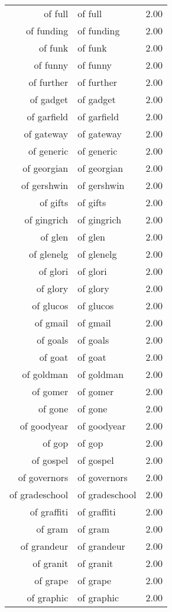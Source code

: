 \begin{table}[ht]
\begin{tabular}{rlr}
  of full & of full & 2.00 \\ 
  of funding & of funding & 2.00 \\ 
  of funk & of funk & 2.00 \\ 
  of funny & of funny & 2.00 \\ 
  of further & of further & 2.00 \\ 
  of gadget & of gadget & 2.00 \\ 
  of garfield & of garfield & 2.00 \\ 
  of gateway & of gateway & 2.00 \\ 
  of generic & of generic & 2.00 \\ 
  of georgian & of georgian & 2.00 \\ 
  of gershwin & of gershwin & 2.00 \\ 
  of gifts & of gifts & 2.00 \\ 
  of gingrich & of gingrich & 2.00 \\ 
  of glen & of glen & 2.00 \\ 
  of glenelg & of glenelg & 2.00 \\ 
  of glori & of glori & 2.00 \\ 
  of glory & of glory & 2.00 \\ 
  of glucos & of glucos & 2.00 \\ 
  of gmail & of gmail & 2.00 \\ 
  of goals & of goals & 2.00 \\ 
  of goat & of goat & 2.00 \\ 
  of goldman & of goldman & 2.00 \\ 
  of gomer & of gomer & 2.00 \\ 
  of gone & of gone & 2.00 \\ 
  of goodyear & of goodyear & 2.00 \\ 
  of gop & of gop & 2.00 \\ 
  of gospel & of gospel & 2.00 \\ 
  of governors & of governors & 2.00 \\ 
  of gradeschool & of gradeschool & 2.00 \\ 
  of graffiti & of graffiti & 2.00 \\ 
  of gram & of gram & 2.00 \\ 
  of grandeur & of grandeur & 2.00 \\ 
  of granit & of granit & 2.00 \\ 
  of grape & of grape & 2.00 \\ 
  of graphic & of graphic & 2.00 \\ 

\end{tabular}
\end{table}
